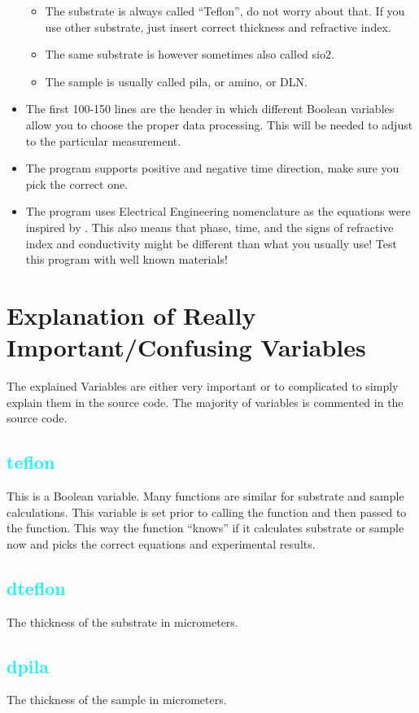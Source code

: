 \documentclass[12pt]{article}
\begin{document}
\begin{itemize}
	\begin{itemize}
		\item	The substrate is always called "`Teflon"', do not worry about that. If you use other substrate, just insert correct thickness and refractive index. 
		\item	The same substrate is however sometimes also called sio2.
		\item	The sample is usually called pila, or amino, or DLN.
	\end{itemize}
	\item	The first 100-150 lines are the header in which different Boolean variables allow you to choose the proper data processing. This will be needed to adjust to the particular measurement. 
	\item	The program supports positive and negative time direction, make sure you pick the correct one. 
	\item The program uses Electrical Engineering nomenclature as the equations were inspired by \cite{Orfanidis}. This also means that phase, time, and the signs of refractive index and conductivity might be different than what you usually use! 
	\achtung \large{Test this program with well known materials!}
\end{itemize}

\section{Explanation of Really Important/Confusing Variables}

The explained Variables are either very important or to complicated to simply explain them in the source code. The majority of variables is commented in the source code. 
\subsection{\textcolor{cyan}{teflon}}
This is a Boolean variable. Many functions are similar for substrate and sample calculations. This variable is set prior to calling the function and then passed to the function. This way the function "`knows"' if it calculates substrate or sample now and picks the correct equations and experimental results. 
\subsection{\textcolor{cyan}{dteflon}}
The thickness of the substrate in micrometers.
\subsection{\textcolor{cyan}{dpila}}
The thickness of the sample in micrometers.
\end{document}
